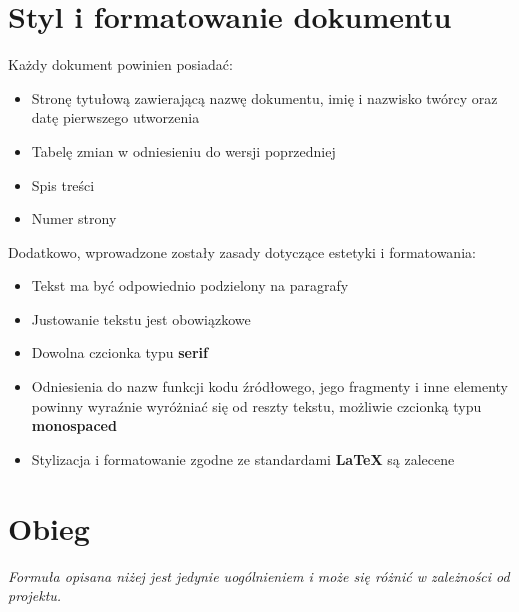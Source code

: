 \documentclass{article}
\begin{document}
\section{Styl i formatowanie dokumentu}
Każdy dokument powinien posiadać:
\begin{itemize}
    \item Stronę tytułową zawierającą nazwę dokumentu, imię i nazwisko twórcy oraz datę pierwszego utworzenia
    \item Tabelę zmian w odniesieniu do wersji poprzedniej
    \item Spis treści
    \item Numer strony
\end{itemize}
Dodatkowo, wprowadzone zostały zasady dotyczące estetyki i formatowania:
\begin{itemize}
    \item Tekst ma być odpowiednio podzielony na paragrafy
    \item Justowanie tekstu jest obowiązkowe
    \item Dowolna czcionka typu \textbf{serif}
    \item Odniesienia do nazw funkcji kodu źródłowego, jego fragmenty i inne elementy powinny wyraźnie wyróżniać się od reszty tekstu, możliwie czcionką typu \textbf{monospaced}
    \item Stylizacja i formatowanie zgodne ze standardami \textbf{LaTeX} są zalecene
\end{itemize}

\section{Obieg}
\begin{center}
    \textit{Formuła opisana niżej jest jedynie uogólnieniem i może się różnić w zależności od projektu.}
\end{center}
\end{document}
